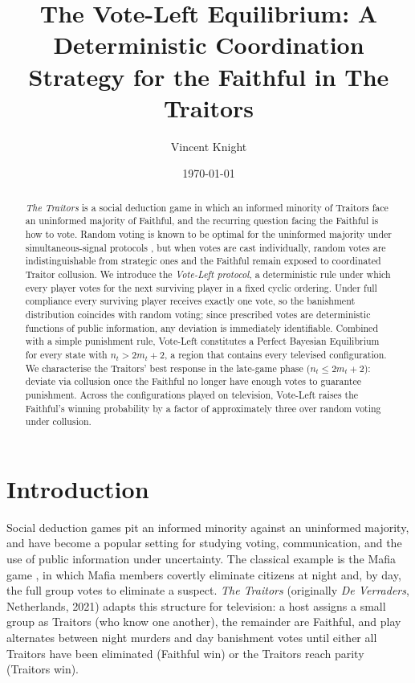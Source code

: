 \documentclass[11pt,a4paper]{article}
\title{The Vote-Left Equilibrium: A Deterministic Coordination
Strategy for the Faithful in The Traitors}
\author{Vincent Knight}
\date{\today}
\begin{document}
\maketitle

\begin{abstract}
\emph{The Traitors} is a social deduction game in which an informed minority
of Traitors face an uninformed majority of Faithful, and the recurring
question facing the Faithful is how to vote. Random voting is known to be
optimal for the uninformed majority under simultaneous-signal protocols
\cite{braverman2008}, but when votes are cast individually, random votes are
indistinguishable from strategic ones and the Faithful remain exposed to
coordinated Traitor collusion. We introduce the \emph{Vote-Left protocol}, a
deterministic rule under which every player votes for the next surviving
player in a fixed cyclic ordering. Under full compliance every surviving
player receives exactly one vote, so the banishment distribution coincides
with random voting; since prescribed votes are deterministic functions of
public information, any deviation is immediately identifiable. Combined with
a simple punishment rule, Vote-Left constitutes a Perfect Bayesian
Equilibrium for every state with \(n_t > 2m_t + 2\), a region that
contains every televised configuration. We characterise the Traitors'
best response in the late-game phase (\(n_t \leq 2m_t + 2\)): deviate
via collusion once the Faithful no longer have enough votes to guarantee
punishment. Across the configurations played on television, Vote-Left
raises the Faithful's winning probability by a factor of approximately
three over random voting under collusion.
\end{abstract}

\section{Introduction}

Social deduction games pit an informed minority against an uninformed
majority, and have become a popular setting for studying voting,
communication, and the use of public information under uncertainty. The
classical example is the Mafia game \cite{davidoff1986}, in which Mafia
members covertly eliminate citizens at night and, by day, the full group
votes to eliminate a suspect. \emph{The Traitors} (originally \emph{De
Verraders}, Netherlands, 2021) adapts this structure for television: a host
assigns a small group as Traitors (who know one another), the remainder
are Faithful, and play alternates between night murders and day
banishment votes until either all Traitors have been eliminated (Faithful
win) or the Traitors reach parity (Traitors win).
\end{document}
